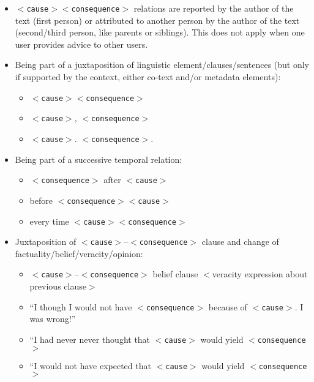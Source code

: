 \documentclass[12pt]{article}
\theoremstyle{definition}
\newcommand{\cause}{$<$\texttt{cause}$>$\xspace}
\newcommand{\conseq}{$<$\texttt{consequence}$>$\xspace}
\begin{document}
\begin{itemize}
\begin{itemize}
        \item \cause was followed by \conseq
        \item \cause entailed \conseq
        \item \conseq is correlated with \cause
        \item \cause is correlated with \conseq and \cause is preceding \conseq
        \item \cause is probably linked with \conseq and \cause is preceding \conseq
    \end{itemize}
    \item \cause \conseq relations are reported by the author of the text (first person) or attributed to another person by the author of the text (second/third person, like parents or siblings). This does not apply when one user provides advice to other users.
    \item Being part of a juxtaposition of linguistic element/clauses/sentences (but only if supported by the context, either co-text and/or metadata elements):
    \begin{itemize}
        \item \cause \conseq
        \item \cause, \conseq
        \item \cause. \conseq.
    \end{itemize}
    \item Being part of a successive temporal relation:
    \begin{itemize}
        \item \conseq after \cause
        \item before \conseq \cause
        \item every time \cause \conseq
    \end{itemize}
    \item Juxtaposition of \cause--\conseq clause and change of factuality/belief/veracity/opinion:
    \begin{itemize}
        \item \cause--\conseq belief clause  $<$veracity expression about previous clause$>$
        \item ``I though I would not have \conseq because of \cause. I was wrong!''
        \item ``I had never never thought that \cause would yield \conseq
        \item ``I would not have expected that \cause would yield \conseq
    \end{itemize}


 
\end{itemize}
\end{document}
